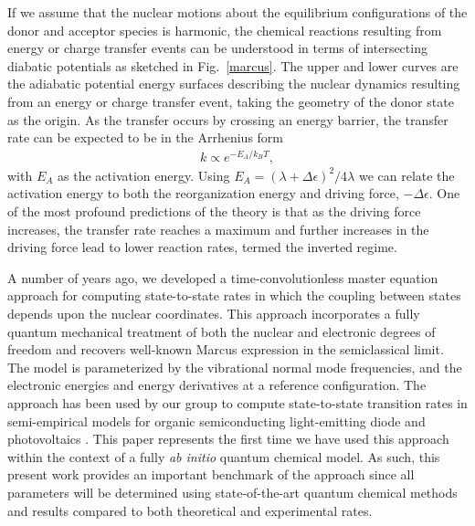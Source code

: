 If we assume that the nuclear motions about the equilibrium configurations of the
donor and acceptor species is harmonic,  the chemical reactions resulting from
energy or charge transfer events can be understood in terms of intersecting
diabatic potentials as sketched in Fig.~\ref{marcus}.    The upper and lower
curves are the adiabatic potential energy surfaces describing the nuclear dynamics
resulting from an energy or charge transfer event, taking the geometry of the donor
state as the origin.
As the transfer occurs by crossing an energy barrier,
the transfer rate can be expected to be in the Arrhenius form
\begin{eqnarray}
k\propto e^{-E_{A}/k_{B}T},
\end{eqnarray}
with $E_{A}$ as the activation energy.
 Using $E_{A}={(\lambda+\Delta \epsilon)^{2}}/{4\lambda}$
 we can relate the activation energy to both the reorganization energy and driving force, $-\Delta \epsilon$.
One of the most profound predictions of the theory is that  as the driving force increases,
the transfer rate reaches a maximum and further increases in the driving force
lead to lower reaction rates, termed the inverted regime.





A number of years ago,  we developed a time-convolutionless  master equation approach for computing
state-to-state rates in which the coupling between  states depends upon the
nuclear coordinates\cite{pereverzev2006time}. This approach incorporates a fully quantum
mechanical treatment of both the nuclear and electronic degrees of freedom and recovers
well-known Marcus expression in the semiclassical limit.  The model is parameterized by the
vibrational normal mode frequencies, and the electronic energies and energy derivatives
at a reference configuration.  The approach has been used by our group to compute state-to-state
transition rates in semi-empirical models for organic semiconducting light-emitting diode and photovoltaics
\cite{tamura2008phonon,tamura2007exciton,bittner2014noise,singh2009fluorescence}.
This paper represents the first time we have used this approach within the context of a fully {\em ab initio} quantum
chemical model.   As such, this present work provides an important benchmark of the approach since all parameters will be determined
using state-of-the-art quantum chemical methods
and results compared to both theoretical and experimental
rates.

